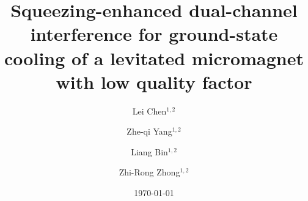 \documentclass[aps, prresearch, reprint, nofootinbib, longbibliography]{revtex4-2}
\begin{document}
	




			
			
			
			\title{Squeezing-enhanced dual-channel interference for ground-state cooling of a levitated micromagnet with low quality factor}
			
			
	\author{Lei Chen$^{1,2}$}
	\author{Zhe-qi Yang$^{1,2}$}
	\author{Liang Bin$^{1,2}$}
	\author{Zhi-Rong Zhong$^{1,2}$}
	\date{\today }
	\address{$^1$Fujian Key Laboratory of Quantum Information and Quantum Optics, Fuzhou University, Fuzhou 350108, China}
    \address{$^2$College of Physics and Information Engineering, Fuzhou University, Fuzhou 350108, China}

	
	
	
	
	
	
	
	
	
	
	
\end{document}
